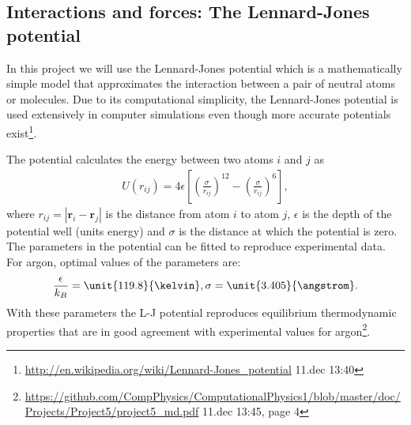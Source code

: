\documentclass[11pt,a4wide]{article}
\renewcommand{\vec}{\mathbf}
\begin{document}
\subsection{Interactions and forces: The Lennard-Jones potential} \label{sec: L-Jpot_forces}

In this project we will use the Lennard-Jones potential which is a mathematically simple model that approximates the interaction between a pair of neutral atoms or molecules. Due to its computational simplicity, the Lennard-Jones potential is used extensively in computer simulations even though more accurate potentials exist\footnote{\url{http://en.wikipedia.org/wiki/Lennard-Jones\_potential} 11.dec 13:40}.

The potential calculates the energy between two atoms $i$ and $j$ as
\begin{align}
	U(r_{ij}) = 4\epsilon\left[\left(\frac{\sigma}{r_{ij}}\right)^{12} - \left(\frac{\sigma}{r_{ij}}\right)^6\right],
\end{align}
where $r_{ij} = |\vec r_i - \vec r_j|$ is the distance from atom $i$ to atom $j$, $\epsilon$ is the depth of the potential well (units energy) and $\sigma$ is the distance at which the potential is zero. The parameters in the potential can be fitted to reproduce experimental data. For argon, optimal values of the parameters are:
\begin{align}
	\frac{\epsilon}{k_B} = \unit{119.8}{\kelvin}, \sigma=\unit{3.405}{\angstrom}.
\end{align}
With these parameters the L-J potential reproduces equilibrium thermodynamic properties that are in good agreement with experimental values for argon\footnote{\url{https://github.com/CompPhysics/ComputationalPhysics1/blob/master/doc/Projects/Project5/project5\_md.pdf} 11.dec 13:45, page 4}.



\end{document}
